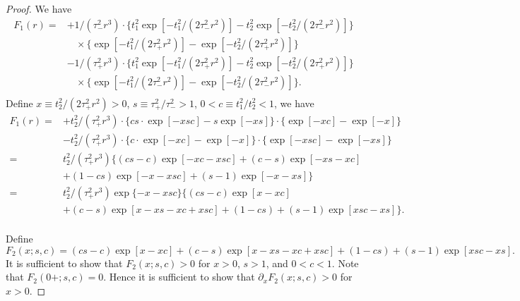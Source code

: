 \documentclass[11pt]{article}
\begin{document}
\begin{proof}
We have
\[
\begin{aligned}
F_1(r)%
=&+  1 / (\tau_-^2 r^3) \cdot\{ t_1^2  \exp[- t_1^2 / (2 \tau_-^2 r^2)] - t_2^2 \exp[- t_2^2 / (2 \tau_-^2 r^2)] \} \\
&~~~~ \times  \{\exp[- t_1^2 / (2 \tau_+^2 r^2)] -  \exp[- t_2^2 / (2 \tau_+^2 r^2)]\} \\
&-   1 / (\tau_+^2 r^3)  \cdot\{ t_1^2 \exp[- t_1^2 / (2 \tau_+^2 r^2)]  - t_2^2 \exp[- t_2^2 / (2 \tau_+^2 r^2)] \} \\
&~~~~ \times  \{\exp[- t_1^2 / (2  \tau_-^2 r^2)] -  \exp[- t_2^2 / (2 \tau_-^2 r^2)]\}. \\
\end{aligned}
\]
Define $x \equiv t_2^2 / (2 \tau_+^2 r^2) > 0$, $s  \equiv \tau_+^2 / \tau_-^2 > 1$, $0 < c  \equiv t_1^2 /t_2^2 < 1$, we have
\[
\begin{aligned}
F_1(r)=&+  t_2^2 / (\tau_+^2 r^3) \cdot\{  cs \cdot \exp[-xsc] - s \exp[-xs] \} \cdot  \{\exp[- xc] -  \exp[- x]\} \\
&-   t_2^2 / (\tau_+^2 r^3)  \cdot\{ c\cdot \exp[- xc]  - \exp[- x] \} \cdot  \{\exp[- xsc] -  \exp[- xs]\}\\
=& t_2^2/(\tau_+^2 r^3) \{(cs - c) \exp[- xc - xsc] + (c - s) \exp[- xs - xc] \\
&+ (1 - cs ) \exp[- x - xsc] + (s - 1) \exp[-x - xs]\}\\
=& t_2^2/(\tau_+^2 r^3) \exp\{ - x - xsc \}\{(cs - c) \exp[x - xc] \\
&+ (c - s) \exp[x - xs - xc + xsc] + (1 - cs) + (s - 1) \exp[xsc - xs]\}.\\
\end{aligned}
\]

Define
\[
F_2(x; s, c) = (cs - c) \exp[x - xc] + (c - s) \exp[x - xs - xc + xsc] + (1 - cs) + (s - 1) \exp[xsc - xs]. 
\]
It is sufficient to show that $F_2(x; s, c) > 0$ for $x > 0$, $s > 1$, and $0 < c < 1$. Note that $F_2(0 +; s, c) = 0$. Hence it is sufficient to show that $\partial_x F_2(x; s, c) > 0$ for $x > 0$. 


\end{proof}
\end{document}
